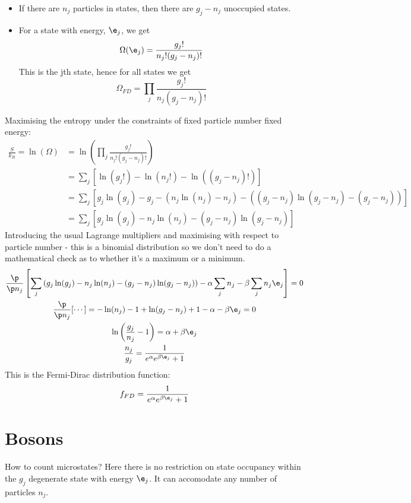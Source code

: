 \documentclass[a4paper, 11pt, normalem]{report}
\begin{document}
\begin{itemize}
    \item If there are $n_j$ particles in states, then there are $g_j - n_j$ unoccupied states.
    \item For a state with energy, $\e_j$, we get
        \begin{equation}
            \Omega(\e_j) = \frac{g_j!}{n_j!(g_j-n_j)!}
        \end{equation}
        This is the jth state, hence for all states we get
        \begin{equation}
            \Omega_{FD} = \prod_j \frac{g_j!}{n_j(g_j-n_j)!}
        \end{equation}
\end{itemize} 
Maximising the entropy under the constraints of fixed particle number fixed energy:
\begin{align}
    \frac{S}{k_B} = \ln(\Omega) &= \ln\left(\prod_j \frac{g_j!}{n_j!(g_j-n_j)!}\right) \\
                                &= \sum_j\left[\ln(g_j!) - \ln(n_j!) - \ln((g_j-n_j)!)\right] \\
                                &= \sum_j\left[g_j\ln(g_j) - g_j - (n_j\ln(n_j) - n_j) - ((g_j-n_j)\ln(g_j-n_j) - (g_j-n_j))\right] \\
                                &= \sum_j\left[g_j\ln(g_j) - n_j\ln(n_j) - (g_j-n_j)\ln(g_j-n_j)\right]
\end{align}
Introducing the usual Lagrange multipliers and maximising with respect to particle number - this is a binomial distribution so we don't need to do a mathematical check as to whether it's a maximum or a minimum.
\begin{gather}
    \frac{\p}{\p n_j}\left[\sum_j\left(g_j\ln(g_j) - n_j\ln(n_j) - (g_j-n_j)\ln(g_j-n_j)\right) - \alpha\sum_jn_j - \beta\sum_jn_j\e_j\right] = 0 \\
        \frac{\p}{\p n_j}[\cdots] = -\ln(n_j) -1 + \ln(g_j-n_j)+1-\alpha-\beta\e_j = 0 \\
        \ln\left(\frac{g_j}{n_j} - 1\right) = \alpha + \beta\e_j \\
        \frac{n_j}{g_j} = \frac{1}{e^{\alpha}e^{\beta\e_j}+1}
\end{gather}
This is the Fermi-Dirac distribution function:
\begin{equation}
    f_{FD} = \frac{1}{e^{\alpha}e^{\beta\e_j}+1}
\end{equation}

\section{Bosons}
How to count microstates? Here there is no restriction on state occupancy within the $g_j$ degenerate state with energy $\e_j$.
It can accomodate any number of particles $n_j$.
\end{document}
